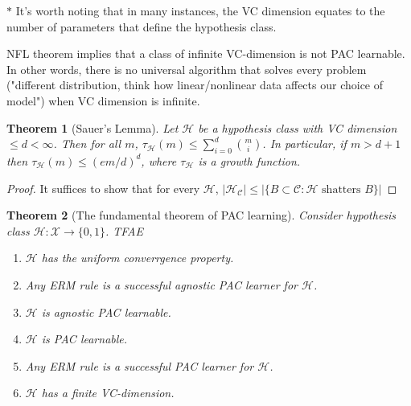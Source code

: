 \documentclass[11pt,reqno]{amsart}
\newtheorem{theorem}{Theorem}
\theoremstyle{remark}
\begin{document}
$\ast$ It's worth noting that in many instances, the VC dimension equates to the number of parameters that define the hypothesis class.

NFL theorem implies that a class of infinite VC-dimension is not PAC learnable. In other words, there is no universal algorithm 
that solves every problem ("different distribution, think how linear/nonlinear data affects our choice of model") when VC dimension is infinite.

\begin{theorem}[Sauer's Lemma]
Let $\mathcal{H}$ be a hypothesis class with VC dimension $\leq d<\infty$. Then for all $m$, $\tau_\mathcal{H}(m)\leq\sum^d_{i=0}\binom{m}i$. In particular, if $m>d+1$ then $\tau_\mathcal{H}(m)\leq (em/d)^d$, where $\tau_\mathcal{H}$ is a growth function.
\end{theorem}
\begin{proof}
It suffices to show that for every $\mathcal{H}$, $\lvert \mathcal{H}_\mathcal{C}\rvert\leq\vert\{B\subset \mathcal{C}:\mathcal{H}\text{ shatters }B\}\vert$
\end{proof}

\begin{theorem}[The fundamental theorem of PAC learning]
Consider hypothesis class $\mathcal{H}:\mathcal{X}\to\{0,1\}$. TFAE
\begin{enumerate}
\item $\mathcal{H}$ has the uniform converrgence property.
\item Any ERM rule is a successful agnostic PAC learner for $\mathcal{H}$.
\item $\mathcal{H}$ is agnostic PAC learnable.
\item $\mathcal{H}$ is PAC learnable.
\item Any ERM rule is a successful PAC learner for $\mathcal{H}$.
\item $\mathcal{H}$ has a finite VC-dimension.
\end{enumerate}
\end{theorem}
\end{document}
